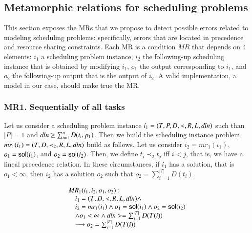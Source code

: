 \begin{comment}
\subsubsection{Operador de intercambio: CSWAP}
CSWAP: Este operador intercambia los parámetros 2 y 3, de la función de \texttt{cumulative} de Minizinc.
\end{comment}

\subsection{Metamorphic relations for scheduling problems}



This section exposes the MRs that we propose to detect possible errors
related to modeling scheduling problems: specifically, errors
that are located in precedence and resource sharing
constraints. Each MR is a condition $MR$ that depends
on 4 elements: $i_{1}$ a scheduling problem instance, $i_{2}$ the
following-up scheduling instance that is obtained by modifying
$i_{1}$, $o_{1}$ the output corresponding to $i_{1}$, and $o_{2}$ the
following-up output that is the output of $i_{2}$. A valid
implementation, a model in our case, should make true the MR.

\subsubsection{MR1. Sequentially of all tasks}

Let us consider a scheduling problem instance $i_1 = (T, P, D, \prec, R,
L, \mathit{dln})$ such than $|P|=1$ and $\mathit{dln}\geq\sum_{i=1}^{n}D(t_{i},p_{1})$.
Then we build the scheduling instance problem
$mr_{1}(i_{1})=(T, D, \prec_{2}, R, L, \mathit{dln})$ build as follows. Let us
consider $i_{2}=mr_1(i_{1})$, $o_{1}=\mathsf{sol}(i_{1})$, and
$o_{2}=\mathsf{sol}(i_{2})$.
Then, we define $t_{i}\prec_{2} t_{j}$ iff $i<j$, that is, we have a lineal
precedence relation. In these circumstances, if $i_{1}$ has a
solution, that is $o_{1}<\infty$,
then $i_{2}$ has a solution $o_{2}$ such that
$o_{2}=\sum_{i=1}^{|T|}D(t_{i})$.

\begin{framed}
  \begin{displaymath}
      \begin{array}{l}
        MR_{1}(i_1,i_2,o_{1},o_{2}):\\
        \hskip 1em i_1=(T,D,\prec,R,L,\mathit{dln})\wedge  \\
        \hskip 1em i_2=mr_1(i_1)\wedge o_{1}=\mathsf{sol}(i_{1})\wedge o_{2}=\mathsf{sol}(i_2)\\
      \hskip 1em \wedge o_{1}<\infty\wedge \mathit{dln}>=\sum_{i=1}^{|T|}D(T(i)) \\
      \hskip 1em \longrightarrow o_2 = \sum_{i=1}^{|T|}D(T(i))
    \end{array}
  \end{displaymath}
\end{framed}






